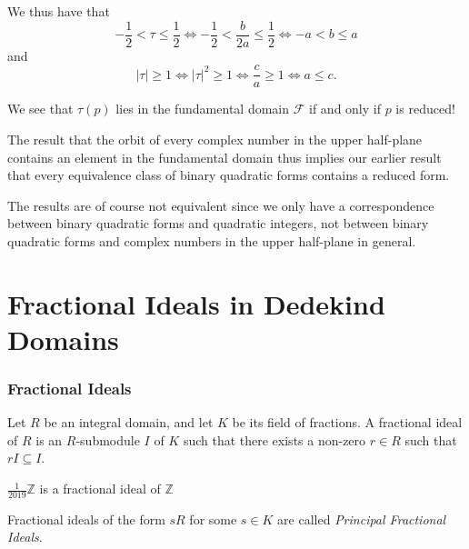 \documentclass{beamer}
\begin{document}
\begin{frame}
	We thus have that
	\[
		-\frac{1}{2} < \tau \leq \frac{1}{2} \iff -\frac{1}{2} < \frac{b}{2a} \leq \frac{1}{2} \iff -a < b \leq a
	\]
	and
	\[
		|\tau| \geq 1 \iff {|\tau|}^2 \geq 1 \iff \frac{c}{a} \geq 1 \iff a \leq c.
	\]
	\pause

	We see that $\tau(p)$ lies in the fundamental domain $\mathcal{F}$ if and only if $p$ is reduced! \pause
	
	The result that the orbit of every complex number in the upper half-plane contains an element in the fundamental domain thus implies our earlier result that every equivalence class of binary quadratic forms contains a reduced form. \pause
	
	The results are of course not equivalent since we only have a correspondence between binary quadratic forms and quadratic integers, not between binary quadratic forms and complex numbers in the upper half-plane in general.
\end{frame}

\section{Fractional Ideals in Dedekind Domains}

\begin{frame}

	\frametitle{Fractional Ideals}

	\begin{definition}
		Let $R$ be an integral domain, and let $K$ be its field of fractions. A fractional ideal of $R$ is an $R$-submodule $I$ of $K$ such that there exists a non-zero $r \in R$ such that $rI \subseteq I$.
	\end{definition}
	\pause

	\begin{example}
		$\frac{1}{2019} \mathbb{Z}$ is a fractional ideal of $\mathbb{Z}$
	\end{example}
	\pause

	\begin{definition}
		Fractional ideals of the form $sR$ for some $s \in K$ are called \emph{Principal Fractional Ideals}.
	\end{definition}

\end{frame}
\end{document}
